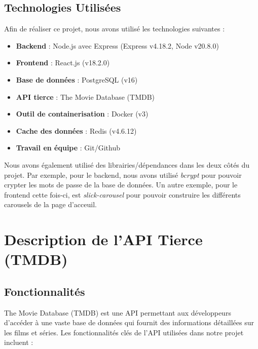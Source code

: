\documentclass[a4paper]{article}
\begin{document}
\subsection{Technologies Utilisées}
Afin de réaliser ce projet, nous avons utilisé les technologies suivantes :\newline 
\begin{itemize}
    \item  \textbf{Backend} : Node.js avec Express (Express v4.18.2, Node v20.8.0)
    \item  \textbf{Frontend} : React.js (v18.2.0)
    \item  \textbf{Base de données} : PostgreSQL (v16)
    \item  \textbf{API tierce} : The Movie Database (TMDB)
    \item  \textbf{Outil de containerisation} : Docker (v3)
    \item  \textbf{Cache des données} : Redis (v4.6.12)
    \item \textbf{Travail en équipe} : Git/Github \newline 
\end{itemize}

Nous avons également utilisé des librairies/dépendances dans les deux côtés du projet. Par exemple, pour le backend, nous avons utilisé \textit{bcrypt} pour pouvoir crypter les mots de passe de la base de données. Un autre exemple, pour le frontend cette fois-ci, est \textit{slick-carousel} pour pouvoir construire les différents carousels de la page d'acceuil.
\newpage

\section{Description de l'API Tierce (TMDB)}

\subsection{Fonctionnalités}
The Movie Database (TMDB) est une API permettant aux développeurs d'accéder à une vaste base de données qui fournit des informations détaillées sur les films et séries. Les fonctionnalités clés de l'API utilisées dans notre projet incluent : \newline 
\end{document}
